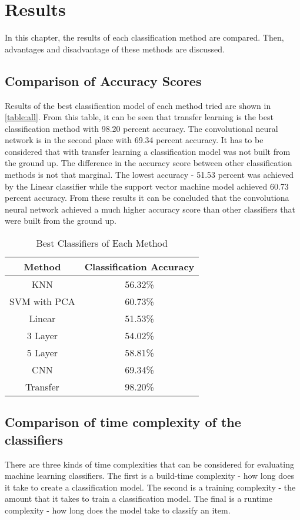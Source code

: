 
\chapter{Results}
In this chapter, the results of each classification method are compared. Then, advantages and disadvantage of these methods are discussed.

\section{Comparison of Accuracy Scores}

Results of the best classification model of each method tried are shown in  \autoref{table:all}. From this table, it can be seen that transfer learning is the best classification method with 98.20 percent accuracy. The convolutional neural network is in the second place with 69.34 percent accuracy. It has to be considered that with transfer learning a classification model was not built from the ground up. The difference in the  accuracy score between other classification methods is not that marginal. The lowest accuracy  - 51.53 percent was achieved by the Linear classifier while the support vector machine model achieved 60.73 percent accuracy.  From these results it can be concluded that the convolutiona neural network achieved a much higher accuracy score than other classifiers that were built from the ground up.

\begin{table}[h]
\begin{center}
\begin{tabular}{ |c|c| } 
 \hline
Method &  Classification Accuracy \\   \hline
KNN    &  56.32\% \\
SVM with PCA   & 60.73\% \\
Linear   &    51.53\%  \\
3 Layer    &   54.02\% \\
5 Layer    &  58.81\% \\
CNN & 69.34\% \\
Transfer  &  98.20\% \\

 \hline
\end{tabular}
\caption{Best Classifiers of Each Method}
\label{table:all}
\end{center}
\end{table}


\section{Comparison  of time complexity of the classifiers}
There are three kinds of time complexities that can be considered for evaluating machine learning classifiers. The first  is a build-time complexity - how long does it take to create a classification model. The second  is a training complexity - the amount that it takes to train a classification model. The final  is a runtime complexity - how long does the model take to classify an item. 

